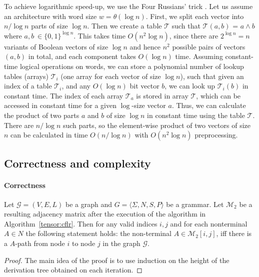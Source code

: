 To achieve logarithmic speed-up, we use the Four Russians' trick \cite{arlazarov1970economical}.
Let us assume an architecture with word size $w= \theta(\log n)$.
First, we split each vector into $n/\log n$ parts of size $\log n$.
Then we create a table $\mathcal{T}$ such that $\mathcal{T}(a, b)$ = $a \wedge b$ where $a, b \ \in {\{0,1\}}^{\log n}$.
This takes time $O(n^2 \log n)$, since there are $2^{\log n} = n$ variants of Boolean vectors of size $\log n$ and hence $n^2$ possible pairs of vectors $(a, b)$ in total, and each component takes $O(\log n)$ time.
Assuming constant-time logical operations on words, we can store a polynomial number of lookup tables (arrays) $\mathcal{T}_i$ (one array for each vector of size $\log n$), such that given an index of a table $\mathcal{T}_i$, and any $O(\log n)$ bit vector $b$, we can look up $\mathcal{T}_i(b)$ in constant time. The index of each array $\mathcal{T}_a$ is stored in array $\mathcal{T}$, which can be accessed in constant time for a given $\log$-size vector $a$. Thus, we can calculate the product of two parts $a$ and $b$ of size $\log n$ in constant time using the table $\mathcal{T}$.
There are $n/\log n$ such parts, so the element-wise product of two vectors of size $n$ can be calculated in time $O(n/\log n)$ with $O(n^2 \log n)$ preprocessing.



\subsection{Correctness and complexity}

\paragraph*{Correctness}
\begin{theorem}
    Let $\mathcal{G} = (V,E,L)$ be a graph and $G = \langle\Sigma, N, S, P\rangle$ be a grammar.
    Let $\mathcal{M}_{2}$ be a resulting adjacency matrix after the execution of the algorithm in Algorithm~\ref{tensor:cflr}. Then for any valid indices $i, j$ and for each nonterminal $A \in N$ the following statement holds: the non-terminal $A \in \mathcal{M}_2[i,j]$, iff there is a $A$-path from node $i$ to node $j$ in the graph $\mathcal{G}$.
\end{theorem}
\begin{proof}
    The main idea of the proof is to use induction on the height of the derivation tree obtained on each iteration.
\end{proof}


